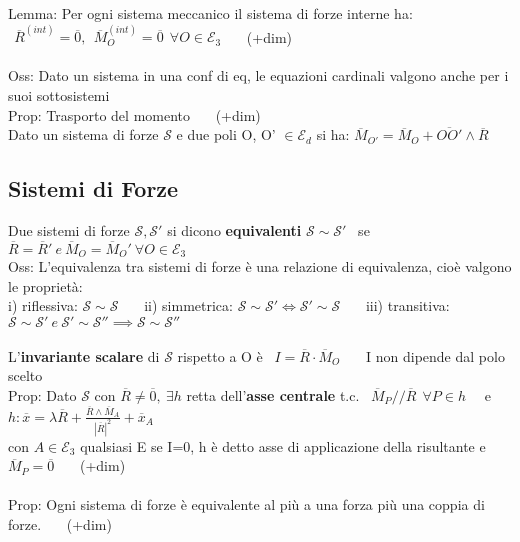\documentclass{article}
\begin{document}
%
Lemma: Per ogni sistema meccanico il sistema di forze interne ha: $\ \ \overline{R}^{(int)}=\overline{0}, \ \ \overline{M}_O^{(int)}=\overline{0} \ \ \forall O \in \mathcal{E}_3$ \ \ \ (+dim)\\ \\
%
%
%
Oss: Dato un sistema in una conf di eq, le equazioni cardinali valgono anche per i suoi sottosistemi\\
%
Prop: Trasporto del momento \ \ \ (+dim)\\
\phantom{Prop: }Dato un sistema di forze $\mathcal{S}$ e due poli O, O' $\in \mathcal{E}_d$ si ha: $\overline{M}_{O'}=\overline{M}_O + \overline{OO'}\wedge\overline{R}$





\subsection{Sistemi di Forze}
%
Due sistemi di forze $\mathcal{S}, \mathcal{S}'$ si dicono \textbf{equivalenti} $\mathcal{S} \sim \mathcal{S}'$ \ se $\overline{R}=\overline{R}' \ e \ \overline{M}_O=\overline{M}_O' \ \forall O \in \mathcal{E}_3$ \\
%
%
Oss: L'equivalenza tra sistemi di forze è una relazione di equivalenza, cioè valgono le proprietà:\\
\phantom{Oss: }i) riflessiva: $\mathcal{S} \sim \mathcal{S}$ \ \ \ ii) simmetrica: $\mathcal{S} \sim \mathcal{S}' \Leftrightarrow \mathcal{S}' \sim \mathcal{S}$ \ \ \ iii) transitiva: $\mathcal{S} \sim \mathcal{S}' \ e \ \mathcal{S}' \sim \mathcal{S}'' \implies \mathcal{S} \sim \mathcal{S}''$ \\ \\
%
%
%
L'\textbf{invariante scalare} di $\mathcal{S}$ rispetto a O è \ $I=\overline{R}\cdot\overline{M}_O$ \ \ \ I non dipende dal polo scelto\\
%
%
Prop: Dato $\mathcal{S}$ con $\overline{R}\neq \overline{0}, \ \exists h$ retta dell'\textbf{asse centrale} t.c. \ $\overline{M}_P /\!\!/ \overline{R} \ \ \forall P\in h$ \ \ e $h: \overline{x}=\lambda\overline{R}+\frac{\overline{R}\wedge\overline{M}_A}{|\overline{R}|^2} + \overline{x}_A$\\
\phantom{Prop: }con $A\in \mathcal{E}_3$ qualsiasi \phantom{\ \ \ } E se I=0, h è detto asse di applicazione della risultante e $\overline{M}_P=\overline{0}$ \ \ \ (+dim)\\ \\
%
%
%
Prop: Ogni sistema di forze è equivalente al più a una forza più una coppia di forze. \ \ \ (+dim)\\
\end{document}
